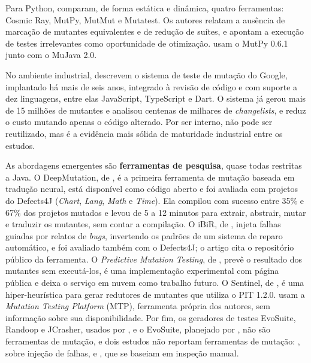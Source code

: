 Para Python,  comparam, de forma estática e dinâmica, quatro ferramentas: Cosmic Ray, MutPy, MutMut e Mutatest. Os autores relatam a ausência de marcação de mutantes equivalentes e de redução de suítes, e apontam a execução de testes irrelevantes como oportunidade de otimização.  usam o MutPy 0.6.1 junto com o MuJava 2.0.

No ambiente industrial,  descrevem o sistema de teste de mutação do Google, implantado há mais de seis anos, integrado à revisão de código e com suporte a dez linguagens, entre elas JavaScript, TypeScript e Dart. O sistema já gerou mais de 15 milhões de mutantes e analisou centenas de milhares de \textit{changelists}, e reduz o custo mutando apenas o código alterado. Por ser interno, não pode ser reutilizado, mas é a evidência mais sólida de maturidade industrial entre os estudos.

As abordagens emergentes são \textbf{ferramentas de pesquisa}, quase todas restritas a Java. O DeepMutation, de , é a primeira ferramenta de mutação baseada em tradução neural, está disponível como código aberto e foi avaliada com projetos do Defects4J (\textit{Chart}, \textit{Lang}, \textit{Math} e \textit{Time}). Ela compilou com sucesso entre 35\% e 67\% dos projetos mutados e levou de 5 a 12 minutos para extrair, abstrair, mutar e traduzir os mutantes, sem contar a compilação. O iBiR, de , injeta falhas guiadas por relatos de \textit{bugs}, invertendo os padrões de um sistema de reparo automático, e foi avaliado também com o Defects4J; o artigo cita o repositório público da ferramenta. O \textit{Predictive Mutation Testing}, de , prevê o resultado dos mutantes sem executá-los, é uma implementação experimental com página pública e deixa o serviço em nuvem como trabalho futuro. O Sentinel, de , é uma hiper-heurística para gerar redutores de mutantes que utiliza o PIT 1.2.0.  usam a \textit{Mutation Testing Platform} (MTP), ferramenta própria dos autores, sem informação sobre sua disponibilidade. Por fim, os geradores de testes EvoSuite, Randoop e JCrasher, usados por , e o EvoSuite, planejado por , não são ferramentas de mutação, e dois estudos não reportam ferramentas de mutação: , sobre injeção de falhas, e , que se baseiam em inspeção manual.


